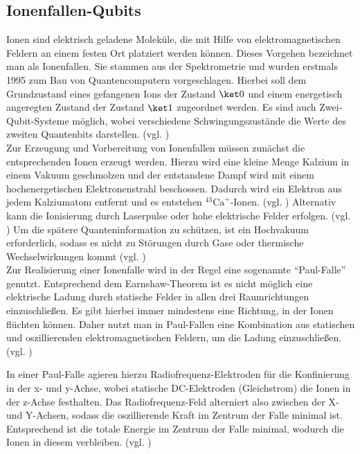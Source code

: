 \subsection{Ionenfallen-Qubits }
\label{subsec: Ionenfallen}
Ionen sind elektrisch geladene Moleküle, die mit Hilfe von elektromagnetischen Feldern an einem festen Ort platziert werden können. Dieses Vorgehen bezeichnet man als Ionenfallen. Sie stammen aus der Spektrometrie und wurden erstmals 1995 zum Bau von Quantencomputern vorgeschlagen. Hierbei soll dem Grundzustand eines gefangenen Ions der Zustand $\ket0$ und einem energetisch angeregten Zustand der Zustand $\ket1$ zugeordnet werden. Es sind auch Zwei-Qubit-Systeme möglich, wobei verschiedene Schwingungszustände die Werte des zweiten Quantenbits darstellen. 
(vgl. \cite[Ch. 10.4]{homeister_quantum_2022-1})
\\

Zur Erzeugung und Vorbereitung von Ionenfallen müssen zunächst die entsprechenden Ionen erzeugt werden. Hierzu wird eine kleine Menge Kalzium in einem Vakuum geschmolzen und der entstandene Dampf wird mit einem hochenergetischen Elektronenstrahl beschossen. Dadurch wird ein Elektron aus jedem Kalziumatom entfernt und es entstehen ${}^{43}\mathrm{Ca}^+$-Ionen. 
(vgl. \cite[Ch. 4.6.1]{kasirajan_fundamentals_2021}) %
Alternativ kann die Ionisierung durch Laserpulse oder hohe elektrische Felder erfolgen. (vgl. \cite[Ch. 21.1]{lapierre_getting_2022}) %
Um die spätere Quanteninformation zu schützen, ist ein Hochvakuum erforderlich, sodass es nicht zu Störungen durch Gase oder thermische Wechselwirkungen kommt (vgl. \cite[Ch. 4.6.1]{kasirajan_fundamentals_2021})
\\

Zur Realisierung einer Ionenfalle wird in der Regel eine sogenannte ``Paul-Falle'' genutzt. Entsprechend dem Earnshaw-Theorem ist es nicht möglich eine elektrische Ladung durch statische Felder in allen drei Raumrichtungen einzuschließen. Es gibt hierbei immer mindestens eine Richtung, in der Ionen flüchten können. Daher nutzt man in Paul-Fallen eine Kombination aus statischen und oszillierenden elektromagnetischen Feldern, um die Ladung einzuschließen. (vgl. \cite[Ch. 21.1]{lapierre_getting_2022}) %

In einer Paul-Falle agieren hierzu Radiofrequenz-Elektroden für die Konfinierung in der x- und y-Achse, wobei statische DC-Elektroden (Gleichstrom) die Ionen in der z-Achse festhalten. Das Radiofrequenz-Feld alterniert also zwischen der X- und Y-Achsen, sodass die oszillierende Kraft im Zentrum der Falle minimal ist. Entsprechend ist die totale Energie im Zentrum der Falle minimal, wodurch die Ionen in diesem verbleiben. (vgl. \cite[Ch. 4.6.1]{kasirajan_fundamentals_2021}) 

